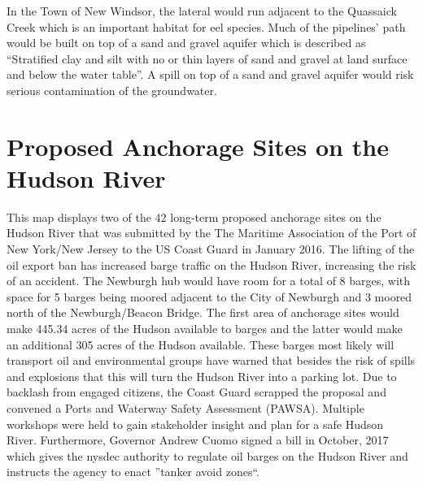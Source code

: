 In the Town of New Windsor, the lateral would run adjacent to the Quassaick 
Creek which is an important habitat for eel species. Much of the pipelines’ path 
would be built on top of a sand and gravel aquifer which is described as 
“Stratified clay and silt with no or thin layers of sand and gravel at land 
surface and below the water table”. A spill on top of a sand and gravel aquifer 
would risk serious contamination of the groundwater.

\section{Proposed Anchorage Sites on the Hudson 
River}\label{subsec:anchorages}
\label{map:proposedanchorages}
This map displays two of the 42 long-term proposed anchorage sites on the Hudson 
River that was submitted by the The Maritime Association of the Port of New 
York/New Jersey to the US Coast Guard in January 2016. The lifting of the oil 
export ban has increased barge traffic on the Hudson River, increasing the risk 
of an accident. The Newburgh hub would have room for a total of 8 barges, with 
space for 5 barges being moored adjacent to the City of Newburgh and 3 moored 
north of the Newburgh/Beacon Bridge. The first area of anchorage sites would 
make 445.34 acres of the Hudson available to barges and the latter would make an 
additional 305 acres of the Hudson available. These barges most likely will 
transport oil and environmental groups have warned that besides the risk of 
spills and explosions that this will turn the Hudson River into a parking lot. 
Due to backlash from engaged citizens, the Coast Guard scrapped the proposal and 
convened a Ports and Waterway Safety Assessment (PAWSA). Multiple workshops were 
held to gain stakeholder insight and plan for a safe Hudson River. Furthermore, 
Governor Andrew Cuomo signed a bill in October, 2017 which gives the 
\gls{nysdec} authority to regulate oil barges on the Hudson River and instructs 
the agency to enact ''tanker avoid zones``.

